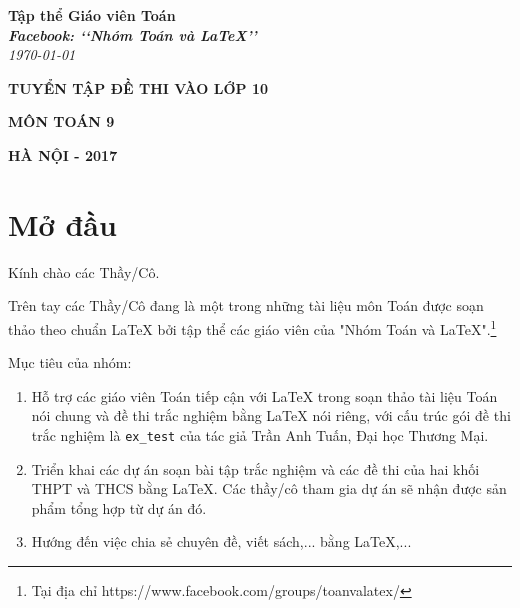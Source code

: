 \documentclass[12pt,a4paper,oneside]{book}
\renewcommand{\baselinestretch}{1.4}
\begin{document}
\providecommand*{\dx}{\ensuremath{\mathrm{\,d}}x}
\providecommand*{\unit}[1]{\ensuremath{\mathrm{\,#1}}}

\begin{titlepage}
\begin{flushright}
\fontsize{17}{0}\selectfont
\textbf{Tập thể Giáo viên Toán}\\
\textbf{\textit{Facebook: \lq\lq Nhóm Toán và LaTeX\rq\rq}}\\
\textit{\color{red}\today}
\end{flushright}

\vspace{4cm}

\begin{flushright}

\vspace{1cm}

 \textbf{\fontsize{30}{0}\selectfont T\fontsize{20}{0}\selectfont UYỂN TẬP ĐỀ THI VÀO LỚP 10}
 
 \vspace{1cm}
 
 \textbf{\fontsize{35}{0}\selectfont MÔN TOÁN 9}
\end{flushright}

\vfill{
\begin{flushright}
\fontsize{17}{0}\textbf{HÀ NỘI - 2017}
\end{flushright}
}
\end{titlepage}
\pagestyle{empty}
\renewcommand{\headrulewidth}{0.4pt}

{\renewcommand{\baselinestretch}{1.3}
\tableofcontents
}

\pagestyle{fancy}
\lhead{\empty}
\rhead{\empty}
\lfoot{\currfilename}
\chapter*{Mở đầu}
Kính chào các Thầy/Cô.

\vspace{0.6cm}

\noindent Trên tay các Thầy/Cô đang là một trong những tài liệu môn Toán được soạn thảo theo chuẩn \LaTeX{} bởi tập thể các giáo viên của "Nhóm Toán và LaTeX".\footnote{Tại địa chỉ https://www.facebook.com/groups/toanvalatex/}

\vspace{0.6cm}

\noindent Mục tiêu của nhóm: 
\begin{enumerate}
\item Hỗ trợ các giáo viên Toán tiếp cận với \LaTeX{} trong soạn thảo tài liệu Toán nói chung và đề thi trắc nghiệm bằng \LaTeX{} nói riêng, với cấu trúc gói đề thi trắc nghiệm là \texttt{ex\_test} của tác giả Trần Anh Tuấn, Đại học Thương Mại.
\item Triển khai các dự án soạn bài tập trắc nghiệm và các đề thi của hai khối THPT và THCS bằng \LaTeX{}. Các thầy/cô tham gia dự án sẽ nhận được sản phẩm tổng hợp từ dự án đó.
\item Hướng đến việc chia sẻ chuyên đề, viết sách,... bằng \LaTeX,...
\end{enumerate}
\end{document}
